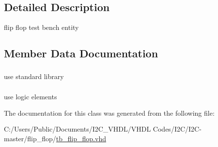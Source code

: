 \subsection{Detailed Description}
flip flop test bench entity 

\subsection{Member Data Documentation}
\subsubsection[{\texorpdfstring{ieee}{ieee}}]{\hspace{0.3cm}{\ttfamily [Library]}}\hypertarget{classtb__flip__flop_a0a6af6eef40212dbaf130d57ce711256}{}\label{classtb__flip__flop_a0a6af6eef40212dbaf130d57ce711256}


use standard library 

\subsubsection[{\texorpdfstring{std\+\_\+logic\+\_\+1164}{std_logic_1164}}]{\hspace{0.3cm}{\ttfamily [Package]}}\hypertarget{classtb__flip__flop_acd03516902501cd1c7296a98e22c6fcb}{}\label{classtb__flip__flop_acd03516902501cd1c7296a98e22c6fcb}


use logic elements 



The documentation for this class was generated from the following file\+:\begin{DoxyCompactItemize}
\item 
C\+:/\+Users/\+Public/\+Documents/\+I2\+C\+\_\+\+V\+H\+D\+L/\+V\+H\+D\+L Codes/\+I2\+C/\+I2\+C-\/master/flip\+\_\+flop/\hyperlink{tb__flip__flop_8vhd}{tb\+\_\+flip\+\_\+flop.\+vhd}\end{DoxyCompactItemize}
